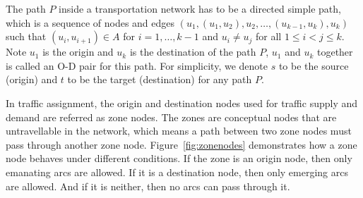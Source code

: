 The path $P$ inside a transportation network has to be a directed simple path, 
which is a sequence of nodes and edges $ (u_1, (u_1, u_2), u_2, \ldots , (u_{k-1}, u_k), u_k ) $
such that $ (u_i, u_{i+1}) \in A$ for $i = 1,\ldots,k-1$ and $u_i \neq u_j$ for all $ 1 \leq i < j \leq k$.
Note $u_1$ is the origin and $u_k$ is the destination of the path $P$, $u_1$ and $u_k$ together is called an O-D pair for this path.
For simplicity, we denote $s$ to be the source (origin) and $t$ to be the target (destination) for any path $P$.

In traffic assignment,
the origin and destination nodes used for traffic supply and demand are referred as zone nodes.
The zones are conceptual nodes that are untravellable in the network,
which means a path between two zone nodes must pass through another zone node.
Figure~\ref{fig:zonenodes} demonstrates how a zone node behaves under different conditions.
If the zone is an origin node, then only emanating arcs are allowed.
If it is a destination node, then only emerging arcs are allowed.
And if it is neither, then no arcs can pass through it.
